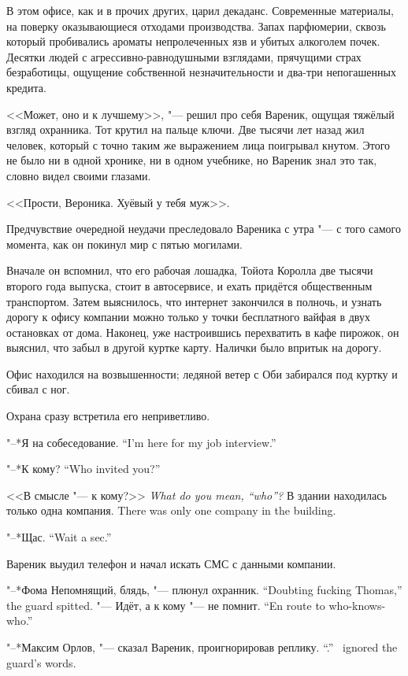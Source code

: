 В этом офисе, как и в прочих других, царил декаданс.
Современные материалы, на поверку оказывающиеся отходами производства.
Запах парфюмерии, сквозь который пробивались ароматы непролеченных язв и убитых алкоголем почек.
Десятки людей с агрессивно-равнодушными взглядами, прячущими страх безработицы, ощущение собственной незначительности и два-три непогашенных кредита.

<<Может, оно и к лучшему>>, "--- решил про себя Вареник, ощущая тяжёлый взгляд охранника.
Тот крутил на пальце ключи.
Две тысячи лет назад жил человек, который с точно таким же выражением лица поигрывал кнутом.
Этого не было ни в одной хронике, ни в одном учебнике, но Вареник знал это так, словно видел своими глазами.

<<Прости, Вероника.
Хуёвый у тебя муж>>.

\asterism

Предчувствие очередной неудачи преследовало Вареника с утра "--- с того самого момента, как он покинул мир с пятью могилами.

Вначале он вспомнил, что его рабочая лошадка, Тойота Королла две тысячи второго года выпуска, стоит в автосервисе, и ехать придётся общественным транспортом.
Затем выяснилось, что интернет закончился в полночь, и узнать дорогу к офису компании можно только у точки бесплатного вайфая в двух остановках от дома.
Наконец, уже настроившись перехватить в кафе пирожок, он выяснил, что забыл в другой куртке карту.
Налички было впритык на дорогу.

Офис находился на возвышенности;
ледяной ветер с Оби забирался под куртку и сбивал с ног.

Охрана сразу встретила его неприветливо.

{"--*Я на собеседование.}
{``I'm here for my job interview.''}

{"--*К кому?}
{``Who invited you?''}

{<<В смысле "--- к кому?>>}
{\textit{What do you mean, ``who''?}}
{В здании находилась только одна компания.}
{There was only one company in the building.}

{"--*Щас.}
{``Wait a sec.''}

Вареник выудил телефон и начал искать СМС с данными компании.

{"--*Фома Непомнящий, блядь, "--- плюнул охранник.}
{``Doubting fucking Thomas,'' the guard spitted.}
{"--- Идёт, а к кому "--- не помнит.}
{``En route to who-knows-who.''}

{"--*Максим Орлов, "--- сказал Вареник, проигнорировав реплику.}
{``\MaksimOrlov.'' \Varenik\ ignored the guard's words.}

